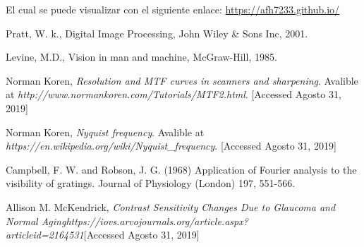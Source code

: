 \documentclass[conference]{IEEEtran}
\begin{document}
El cual se puede visualizar con el siguiente enlace: \url{https://afh7233.github.io/}

\begin{thebibliography}{00}
 Pratt, W. k., Digital Image Processing, John Wiley \& Sons Inc, 2001.

 Levine, M.D., Vision in man and machine, McGraw-Hill, 1985.

 Norman Koren, \textit{Resolution and MTF curves in scanners and sharpening}. Avalible at \textit{http://www.normankoren.com/Tutorials/MTF2.html}. [Accessed Agosto 31, 2019]

 Norman Koren, \textit{Nyquist frequency}. Avalible at \textit{https://en.wikipedia.org/wiki/Nyquist\_frequency}. [Accessed Agosto 31, 2019]


 Campbell, F. W. and Robson, J. G. (1968) Application of Fourier analysis to the visibility of gratings. Journal of Physiology (London) 197, 551-566.

 Allison M. McKendrick, \textit{Contrast Sensitivity Changes Due to Glaucoma and Normal Aging}\textit{https://iovs.arvojournals.org/article.aspx?\\articleid=2164531}[Accessed Agosto 31, 2019]

\end{thebibliography}


\end{document}
